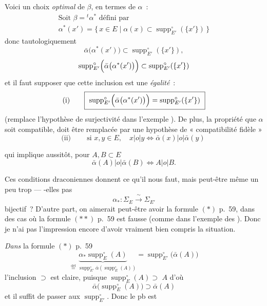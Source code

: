 \documentclass[11pt,a4paper]{article}
\begin{document}
Voici un choix \emph{optimal} de $\beta$, en termes de $\alpha$~:
\begin{gather*}
\text{Soit } \beta = {}^{t}\alpha^{*} \text{ défini par} \\
\alpha^{*}(x') = \bigl\{\, x \in E \mid \alpha(x) \subset \operatorname{supp}^{\circ}_{E'}(\{x'\}) \,\bigr\}
\end{gather*}
    donc tautologiquement
\[ \bar\alpha\bigl(\alpha^{*}(x')\bigr) \subset \operatorname{supp}^{\circ}_{E'}(\{x'\}), \]
  
\[ \operatorname{supp}^{\circ}_{E'}\Bigl(\bar\alpha\bigl(\alpha^{*}(x')\bigr)\Bigr) \subset \operatorname{supp}^{\circ}_{E'}(\{x'\}) \]
et il faut supposer que cette inclusion est une \emph{égalité}~:
\[ \text{(i)} \qquad \boxed{\ \operatorname{supp}^{\circ}_{E'}\Bigl(\bar\alpha\bigl(\alpha^{*}(x')\bigr)\Bigr) = \operatorname{supp}^{\circ}_{E'}(\{x'\})\ } \]
(remplace l'hypothèse de surjectivité dans l'exemple ). De plus, la propriété que $\alpha$ soit compatible, doit être remplacée par une hypothèse de « compatibilité fidèle »
\[ \text{(ii)} \qquad \boxed{\ \text{si } x, y \in E,\quad x \mathrel{|o|} y \Longleftrightarrow \bar\alpha(x) \mathrel{|o|} \bar\alpha(y)\ } \]

qui implique aussitôt, pour $A, B \subset E$
\[ \bar\alpha(A) \mathrel{|o|} \bar\alpha(B) \Longleftrightarrow A \mathrel{|o|} B. \]

Ces conditions draconiennes donnent ce qu'il nous faut, mais peut-être même un peu  trop --- -elles pas 
\[ \alpha_{*} : \Sigma_E \xrightarrow{\ \sim\ } \Sigma_{E'} \]
bijectif~? \struck{\ill{}} D'autre part, on aimerait peut-être  avoir la formule $(*)$ p.~59, dans des cas où la formule $(**)$ p.~59 est fausse (comme dans l'exemple des ). Donc je n'ai pas l'impression encore d'avoir vraiment bien compris la situation.

\emph{Dans} la formule $(*)$ p.~59
\[ \underbrace{\alpha_{*}\operatorname{supp}^{\circ}_{E}(A)}_{\overset{\text{déf}}{=}\ \operatorname{supp}^{\circ}_{E'}\bar\alpha(\operatorname{supp}^{\circ}_{E}(A))} = \operatorname{supp}^{\circ}_{E'}\bigl(\bar\alpha(A)\bigr) \]
l'inclusion $\supset$ est claire, puisque $\operatorname{supp}^{\circ}_{E}(A) \supset$  $A$ d'où
\[ \bar\alpha\bigl(\operatorname{supp}^{\circ}_{E}(A)\bigr) \supset \bar\alpha(A) \]
et il suffit de passer aux $\operatorname{supp}^{\circ}_{E'}$. Donc le pb est
\end{document}
